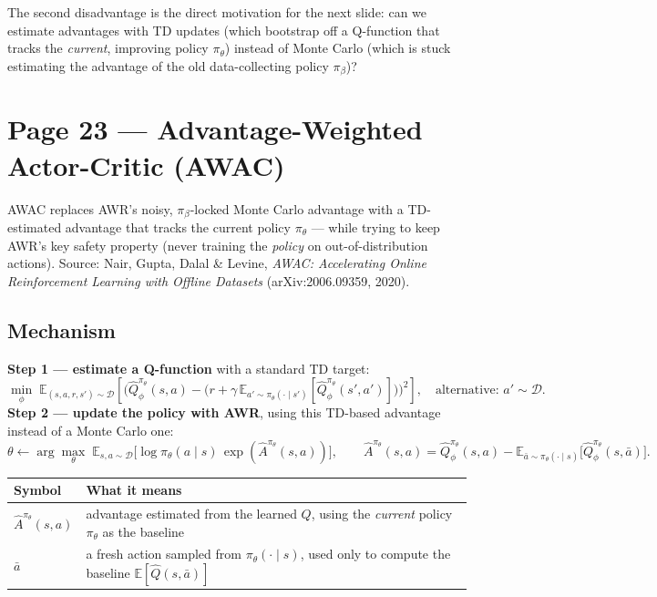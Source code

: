 \documentclass[11pt]{article}
\begin{document}
The second disadvantage is the direct motivation for the next slide: can we estimate advantages with TD updates (which bootstrap off a Q-function that tracks the \emph{current}, improving policy $\pi_\theta$) instead of Monte Carlo (which is stuck estimating the advantage of the old data-collecting policy $\pi_\beta$)?

\section*{Page 23 --- Advantage-Weighted Actor-Critic (AWAC)}

AWAC replaces AWR's noisy, $\pi_\beta$-locked Monte Carlo advantage with a TD-estimated advantage that tracks the current policy $\pi_\theta$ --- while trying to keep AWR's key safety property (never training the \emph{policy} on out-of-distribution actions). Source: Nair, Gupta, Dalal \& Levine, \emph{AWAC: Accelerating Online Reinforcement Learning with Offline Datasets} (arXiv:2006.09359, 2020).

\subsection*{Mechanism}

\textbf{Step 1 --- estimate a Q-function} with a standard TD target:
\[
\min_\phi\; \mathbb{E}_{(s,a,r,s')\sim\mathcal{D}}\left[\Big(\hat Q^{\pi_\theta}_\phi(s,a) - \big(r + \gamma\,\mathbb{E}_{a'\sim\pi_\theta(\cdot\mid s')}[\hat Q^{\pi_\theta}_\phi(s',a')]\big)\Big)^2\right], \quad \text{alternative: } a' \sim \mathcal{D}.
\]
\textbf{Step 2 --- update the policy with AWR}, using this TD-based advantage instead of a Monte Carlo one:
\[
\theta \leftarrow \arg\max_\theta\; \mathbb{E}_{s,a\sim\mathcal{D}}\big[\log\pi_\theta(a\mid s)\,\exp(\hat A^{\pi_\theta}(s,a))\big], \qquad
\hat A^{\pi_\theta}(s,a) = \hat Q^{\pi_\theta}_\phi(s,a) - \mathbb{E}_{\bar a\sim\pi_\theta(\cdot\mid s)}\big[\hat Q^{\pi_\theta}_\phi(s,\bar a)\big].
\]

\begin{center}
\begin{tabular}{@{}ll@{}}
\toprule
Symbol & What it means \\
\midrule
$\hat A^{\pi_\theta}(s,a)$ & advantage estimated from the learned $Q$, using the \emph{current} policy $\pi_\theta$ as the baseline \\
$\bar a$ & a fresh action sampled from $\pi_\theta(\cdot\mid s)$, used only to compute the baseline $\mathbb E[\hat Q(s,\bar a)]$ \\
\bottomrule
\end{tabular}
\end{center}
\end{document}

